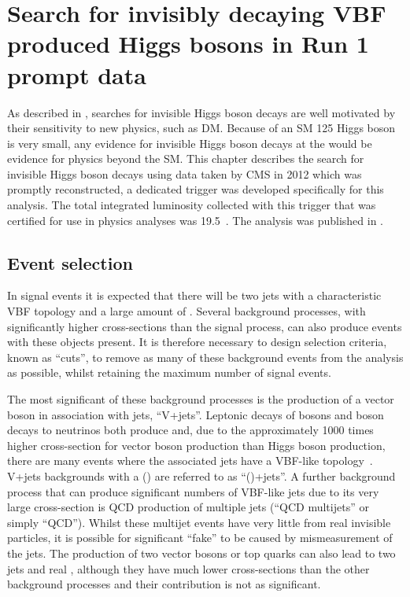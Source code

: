 \chapter{Search for invisibly decaying VBF produced Higgs bosons in Run 1 prompt data}
\label{chap:prompt}
As described in , searches for invisible Higgs boson decays are well motivated by their sensitivity to new physics, such as \ac{DM}. Because \BRinv of an \ac{SM} 125 \GeV Higgs boson is very small, any evidence for invisible Higgs boson decays at the \LHC would be evidence for physics beyond the \ac{SM}. This chapter describes the search for invisible Higgs boson decays using data taken by CMS in 2012 which was promptly reconstructed, a dedicated trigger was developed specifically for this analysis. The total integrated luminosity collected with this trigger that was certified for use in physics analyses was 19.5\invfb~\cite{CMS-PAS-LUM-13-001}. The analysis was published in .

\section{Event selection}
\label{sec:promptsel}
In signal events it is expected that there will be two jets with a characteristic \ac{VBF} topology and a large amount of \MET. Several background processes, with significantly higher cross-sections than the signal process, can also produce events with these objects present. It is therefore necessary to design selection criteria, known as ``cuts'', to remove as many of these background events from the analysis as possible, whilst retaining the maximum number of signal events.

The most significant of these background processes is the production of a vector boson in association with jets, ``V+jets''. Leptonic decays of \PW bosons and \PZ boson decays to neutrinos both produce \MET and, due to the approximately 1000 times higher cross-section for vector boson production than Higgs boson production, there are many events where the associated jets have a \ac{VBF}-like topology~\cite{CMSSMPPublic}. V+jets backgrounds with a \PW (\PZ) are referred to as ``\PW(\PZ)+jets''.
A further background process that can produce significant numbers of \ac{VBF}-like jets due to its very large cross-section is \ac{QCD} production of multiple jets (``\ac{QCD} multijets'' or simply ``\ac{QCD}''). Whilst these multijet events have very little \MET from real invisible particles, it is possible for significant ``fake'' \MET to be caused by mismeasurement of the jets. The production of two vector bosons or top quarks can also lead to two jets and real \MET, although they have much lower cross-sections than the other background processes and their contribution is not as significant. %

